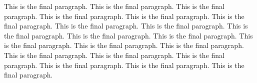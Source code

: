 This is the final paragraph. This is the final paragraph.
This is the final paragraph. This is the final paragraph.
This is the final paragraph. This is the final paragraph.
This is the final paragraph. This is the final paragraph.
This is the final paragraph. This is the final paragraph.
This is the final paragraph. This is the final paragraph.
This is the final paragraph. This is the final paragraph.
This is the final paragraph. This is the final paragraph.
This is the final paragraph. This is the final paragraph.
This is the final paragraph. This is the final paragraph.

\bye
